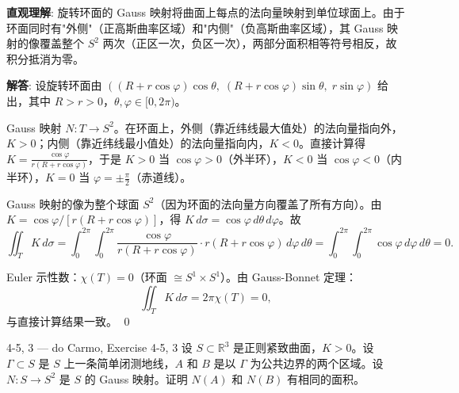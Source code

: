 \begin{solution}
\textbf{直观理解}: 旋转环面的 Gauss 映射将曲面上每点的法向量映射到单位球面上。由于环面同时有"外侧"（正高斯曲率区域）和"内侧"（负高斯曲率区域），其 Gauss 映射的像覆盖整个 $S^2$ 两次（正区一次，负区一次），两部分面积相等符号相反，故积分抵消为零。

\textbf{解答}: 设旋转环面由 $( (R + r\cos\varphi)\cos\theta,\; (R+r\cos\varphi)\sin\theta,\; r\sin\varphi )$ 给出，其中 $R>r>0$，$\theta,\varphi \in [0,2\pi)$。

Gauss 映射 $N: T \to S^2$。在环面上，外侧（靠近纬线最大值处）的法向量指向外，$K>0$；内侧（靠近纬线最小值处）的法向量指向内，$K<0$。直接计算得 $K = \frac{\cos\varphi}{r(R+r\cos\varphi)}$，于是 $K>0$ 当 $\cos\varphi>0$（外半环），$K<0$ 当 $\cos\varphi<0$（内半环），$K=0$ 当 $\varphi = \pm\frac{\pi}{2}$（赤道线）。

Gauss 映射的像为整个球面 $S^2$（因为环面的法向量方向覆盖了所有方向）。由 $K = \cos\varphi/[r(R+r\cos\varphi)]$，得 $K\,d\sigma = \cos\varphi\, d\theta\, d\varphi$。故
\[
\iint_T K\, d\sigma = \int_0^{2\pi}\!\int_0^{2\pi} \frac{\cos\varphi}{r(R+r\cos\varphi)}\cdot r(R+r\cos\varphi)\, d\varphi\, d\theta = \int_0^{2\pi}\!\int_0^{2\pi} \cos\varphi\, d\varphi\, d\theta = 0.
\]

Euler 示性数：$\chi(T) = 0$（环面 $\cong S^1 \times S^1$）。由 Gauss-Bonnet 定理：
\[
\iint_T K\, d\sigma = 2\pi\chi(T) = 0,
\]
与直接计算结果一致。
\qed
\end{solution}

\begin{exercise}{4-5, 3 — do Carmo, Exercise 4-5, 3}
设 $S \subset \mathbb{R}^3$ 是正则紧致曲面，$K > 0$。设 $\Gamma \subset S$ 是 $S$ 上一条简单闭测地线，$A$ 和 $B$ 是以 $\Gamma$ 为公共边界的两个区域。设 $N: S \to S^2$ 是 $S$ 的 Gauss 映射。证明 $N(A)$ 和 $N(B)$ 有相同的面积。
\end{exercise}


